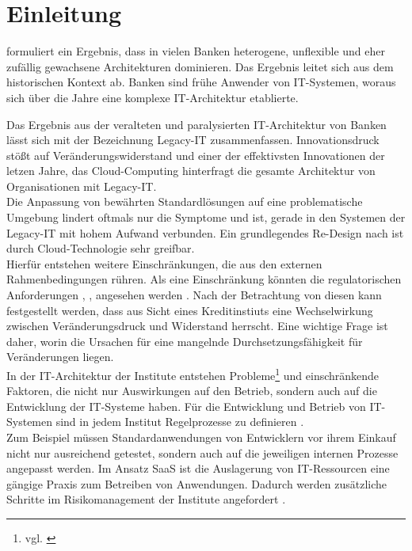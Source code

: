 \chapter{Einleitung}
\label{ch:intro}

\citet{Brockhoff2006} formuliert ein Ergebnis, dass in vielen Banken heterogene, unflexible und eher zufällig gewachsene Architekturen dominieren. Das Ergebnis leitet sich aus dem historischen Kontext ab. Banken sind frühe Anwender von IT-Systemen, woraus sich über die Jahre eine komplexe IT-Architektur etablierte.

Das Ergebnis aus der veralteten und paralysierten IT-Architektur von Banken lässt sich mit der Bezeichnung Legacy-IT \cite{Dorschel2018, Strietzel2018} zusammenfassen.
Innovationsdruck stößt auf Veränderungswiderstand und einer der effektivsten Innovationen der letzen Jahre, das Cloud-Computing hinterfragt die gesamte Architektur von Organisationen mit Legacy-IT.
\medskip
\\
Die Anpassung von bewährten Standardlösungen auf eine problematische Umgebung \cite{Bussmann2006, Brockhoff2006, Strietzel2018} lindert oftmals nur die Symptome und ist, gerade in den Systemen der Legacy-IT mit hohem Aufwand verbunden. Ein grundlegendes Re-Design nach \citet[27]{Bussmann2006} ist durch Cloud-Technologie sehr greifbar.
\medskip
\\
Hierfür entstehen weitere Einschränkungen, die aus den externen Rahmenbedingungen rühren. Als eine Einschränkung könnten die regulatorischen Anforderungen \cite{MaRisk:2017}, \cite{BAIT:2018}, \cite{eba:2019} angesehen werden \cite{recht/Bornemann2018}. Nach der Betrachtung von diesen kann festgestellt werden, dass aus Sicht eines Kreditinstiuts eine Wechselwirkung zwischen Veränderungsdruck und Widerstand herrscht. Eine wichtige Frage ist daher, worin die Ursachen für eine mangelnde Durchsetzungsfähigkeit für Veränderungen liegen.
\medskip
\\
In der IT-Architektur der Institute entstehen Probleme\footnote{vgl. \cite{mci/Disterer2011}} und einschränkende Faktoren, die nicht nur Auswirkungen auf den Betrieb, sondern auch auf die Entwicklung der IT-Systeme haben. Für die Entwicklung und Betrieb von IT-Systemen sind in jedem Institut Regelprozesse zu definieren \cite{MaRisk:2017}. 
\medskip
\\
Zum Beispiel müssen Standardanwendungen von Entwicklern vor ihrem Einkauf nicht nur ausreichend getestet, sondern auch auf die jeweiligen internen Prozesse angepasst werden. Im Ansatz \ac{SaaS} ist die Auslagerung von IT-Ressourcen eine gängige Praxis zum Betreiben von Anwendungen. Dadurch werden zusätzliche Schritte im Risikomanagement der Institute angefordert \cite{MaRisk:2017}.
